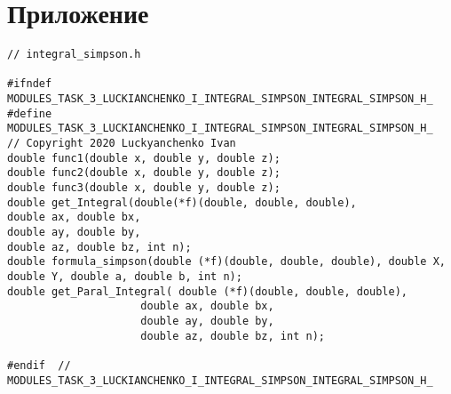 \documentclass{report}
\begin{document}
\section*{Приложение}
\begin{lstlisting}
// integral_simpson.h

#ifndef  MODULES_TASK_3_LUCKIANCHENKO_I_INTEGRAL_SIMPSON_INTEGRAL_SIMPSON_H_
#define  MODULES_TASK_3_LUCKIANCHENKO_I_INTEGRAL_SIMPSON_INTEGRAL_SIMPSON_H_
// Copyright 2020 Luckyanchenko Ivan
double func1(double x, double y, double z);
double func2(double x, double y, double z);
double func3(double x, double y, double z);
double get_Integral(double(*f)(double, double, double),
double ax, double bx,
double ay, double by,
double az, double bz, int n);
double formula_simpson(double (*f)(double, double, double), double X, double Y, double a, double b, int n);
double get_Paral_Integral( double (*f)(double, double, double),
                     double ax, double bx,
                     double ay, double by,
                     double az, double bz, int n);

#endif  //   MODULES_TASK_3_LUCKIANCHENKO_I_INTEGRAL_SIMPSON_INTEGRAL_SIMPSON_H_

\end{lstlisting}
\end{document}
